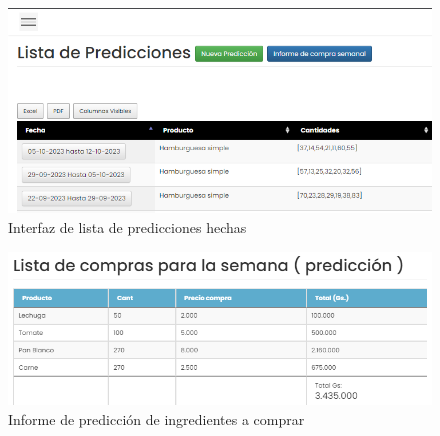   \begin{figure}[H]
    \begin{center}
      \includegraphics[scale=0.65]{./sistema/lista_predicciones.png}
      \caption{Interfaz de lista de predicciones hechas}
      \label{fig:product}
    \end{center}
  \end{figure}

  \begin{figure}[H]
    \begin{center}
      \includegraphics[scale=0.65]{./sistema/Informe de compra prediccion.png}
      \caption{Informe de predicción de ingredientes a comprar }
      \label{fig:product}
    \end{center}
  \end{figure}



